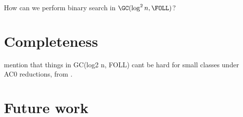 \documentclass{article}
\begin{document}
\begin{todo}
  How can we perform binary search in $\GC(\log^2 n, \FOLL)$?
\end{todo}

\section{Completeness}

\begin{todo}
  mention that things in GC(log2 n, FOLL) cant be hard for small classes under AC0 reductions, from \cite{ctw10}.
\end{todo}

\section{Future work}
\end{document}
